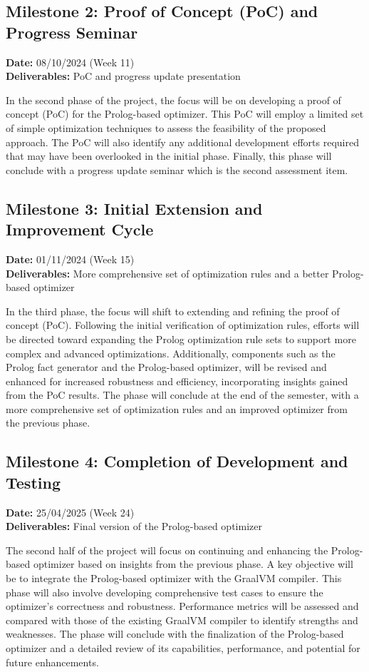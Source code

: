 \subsection{Milestone 2: Proof of Concept (PoC) and Progress Seminar}

\textbf{Date:} 08/10/2024 (Week 11) \\
\textbf{Deliverables:} PoC and progress update presentation

In the second phase of the project, the focus will be on developing a proof of concept (PoC) for the Prolog-based optimizer. This PoC will employ a limited set of simple optimization techniques to assess the feasibility of the proposed approach. The PoC will also identify any additional development efforts required that may have been overlooked in the initial phase. Finally, this phase will conclude with a progress update seminar which is the second assessment item.

\subsection{Milestone 3: Initial Extension and Improvement Cycle}

\textbf{Date:} 01/11/2024 (Week 15) \\
\textbf{Deliverables:} More comprehensive set of optimization rules and a better Prolog-based optimizer

In the third phase, the focus will shift to extending and refining the proof of concept (PoC). Following the initial verification of optimization rules, efforts will be directed toward expanding the Prolog optimization rule sets to support more complex and advanced optimizations. Additionally, components such as the Prolog fact generator and the Prolog-based optimizer, will be revised and enhanced for increased robustness and efficiency, incorporating insights gained from the PoC results. The phase will conclude at the end of the semester, with a more comprehensive set of optimization rules and an improved optimizer from the previous phase.

\subsection{Milestone 4: Completion of Development and Testing}

\textbf{Date:} 25/04/2025 (Week 24) \\
\textbf{Deliverables:} Final version of the Prolog-based optimizer

The second half of the project will focus on continuing and enhancing the Prolog-based optimizer based on insights from the previous phase. A key objective will be to integrate the Prolog-based optimizer with the GraalVM compiler. This phase will also involve developing comprehensive test cases to ensure the optimizer’s correctness and robustness. Performance metrics will be assessed and compared with those of the existing GraalVM compiler to identify strengths and weaknesses. The phase will conclude with the finalization of the Prolog-based optimizer and a detailed review of its capabilities, performance, and potential for future enhancements.

